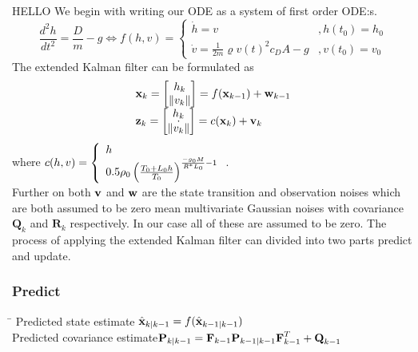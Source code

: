 HELLO
We begin with writing our ODE as a system of first order ODE:s.
\begin{equation*}
	\frac{d^2h}{dt^2} = \frac{D}{m} - g \Longleftrightarrow f(h,v)=
	\left\lbrace
	\begin{array}{ll}
		\dot{h}= v & , h(t_0)=h_0 \\
		\dot{v}= \frac{1}{2m}\varrho v(t)^2c_DA-g& , v(t_0)=v_0
	\end{array}
	\right.
\end{equation*}
The extended Kalman filter can be formulated as
\begin{equation*}
	\begin{array}{l}
		\textbf{x}_k = \left[ \begin{matrix} h_{k} \\ \| v_{k} \| \end{matrix}\right]= f(\textbf{x}_{k-1})+\textbf{w}_{k-1}\\
		\textbf{z}_k = \left[ \begin{matrix} h_{k} \\ \dot{\| v_{k} \|} \end{matrix}\right]=  c(\textbf{x}_k)+\textbf{v}_k
	\end{array}
\end{equation*}
where $c(h,v) = \left\lbrace \begin{array}{l} h \\ 0.5\rho_0\left(\frac{T_0+L_0h}{T_0}\right)^{\frac{-g_0M} {R^*L_0}-1} \end{array} \right.$. \\
Further on both $\textbf{v}$ and $\textbf{w}$ are the state transition and observation noises which are both assumed to be zero mean multivariate Gaussian noises with covariance $\textbf{Q}_k$ and $\textbf{R}_k$ respectively. In our case all of these are assumed to be zero.
The process of applying the extended Kalman filter can divided into two parts predict and update.\\
\subsubsection*{Predict}
\begin{tabbing}
\hspace{6cm}\=\kill
Predicted state estimate \> $\hat{\textbf{x}}_{k|k-1}=f(\hat{\textbf{x}}_{k-1|k-1})$ \\
Predicted covariance estimate\>$\textbf{P}_{k|k-1} = \textbf{F}_{k-1}\textbf{P}_{k-1|k-1}\textbf{F}_{k-1}^T+\textbf{Q}_{k-1}$
\end{tabbing}
